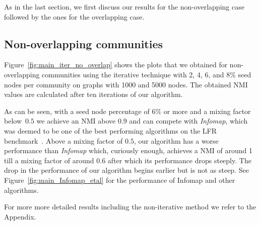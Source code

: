 \newcommand{\plotwidth}{0.8\linewidth}
\newcommand{\cfinderwidth}{0.96\linewidth}
\newcommand{\otherplotswidth}{0.76\linewidth}

As in the last section, we first discuss our results for the non-overlapping case followed by 
the ones for the overlapping case.

\subsection{Non-overlapping communities}
Figure~\ref{fig:main_iter_no_overlap} shows the plots that we obtained for non-overlapping 
communities using the iterative technique with 2, 4, 6, and 8$\%$ seed nodes per 
community on graphs with 1000 and 5000 nodes. The obtained NMI values are calculated 
after ten iterations of our algorithm.

As can be seen, with a seed node percentage of 6$\%$ or more and 
a mixing factor below~$0.5$ we achieve an NMI above $0.9$ and can compete with \textit{Infomap}, 
which was deemed to be one of the best performing algorithms on the LFR benchmark~\cite{LF09}. 
Above a mixing factor of $0.5$, our algorithm has a worse performance than \textit{Infomap} 
which, curiously enough, achieves a NMI of around 1 till a mixing factor of around 
$0.6$ after which its performance drops steeply. The drop in the performance of our algorithm 
begins earlier but is not as steep. See Figure~\ref{fig:main_Infomap_etal} for the performance 
of Infomap and other algorithms.

For more more detailed results including the non-iterative method we refer to the Appendix.
 
 


